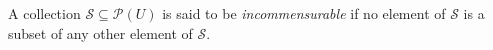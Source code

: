 A collection $\mathcal{S} \subseteq \mathcal{P}(U)$ is said to be \textit{incommensurable} if no element of $\mathcal{S}$ is a subset of any other element of $\mathcal{S}$.
